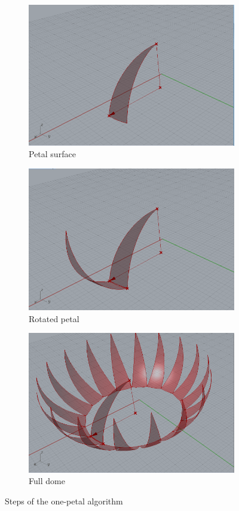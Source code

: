 \documentclass[preprint,12pt,3p]{elsarticle}
\begin{document}
\begin{figure}
\begin{subfigure}{0.3\textwidth}
  \centering
  \includegraphics[width=.9\linewidth]{a01s06.png}
  \caption{Petal surface}
  \label{fig:a01s06}
\end{subfigure}
\begin{subfigure}{0.3\textwidth}
  \centering
  \includegraphics[width=.9\linewidth]{a01s08.png}
  \caption{Rotated petal}
  \label{fig:a01s08}
\end{subfigure}
\begin{subfigure}{0.3\textwidth}
  \centering
  \includegraphics[width=.9\linewidth]{a01s09.png}
  \caption{Full dome}
  \label{fig:a01s09}
\end{subfigure}


\caption{Steps of the one-petal algorithm}
\label{fig:a01steps}
\end{figure}
\end{document}
